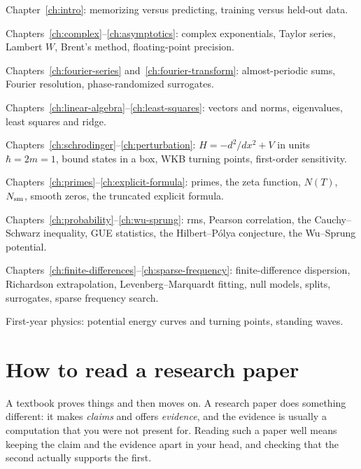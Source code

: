 \begin{prerequisites}
\item Chapter~\ref{ch:intro}: memorizing versus predicting, training versus held-out data.
\item Chapters~\ref{ch:complex}--\ref{ch:asymptotics}: complex exponentials, Taylor series, Lambert $W$, Brent's method, floating-point precision.
\item Chapters~\ref{ch:fourier-series} and~\ref{ch:fourier-transform}: almost-periodic sums, Fourier resolution, phase-randomized surrogates.
\item Chapters~\ref{ch:linear-algebra}--\ref{ch:least-squares}: vectors and norms, eigenvalues, least squares and ridge.
\item Chapters~\ref{ch:schrodinger}--\ref{ch:perturbation}: $H=-d^2/dx^2+V$ in units $\hbar=2m=1$, bound states in a box, WKB turning points, first-order sensitivity.
\item Chapters~\ref{ch:primes}--\ref{ch:explicit-formula}: primes, the zeta function, $N(T)$, $N_{\mathrm{sm}}$, smooth zeros, the truncated explicit formula.
\item Chapters~\ref{ch:probability}--\ref{ch:wu-sprung}: rms, Pearson correlation, the Cauchy--Schwarz inequality, GUE statistics, the Hilbert--P\'olya conjecture, the Wu--Sprung potential.
\item Chapters~\ref{ch:finite-differences}--\ref{ch:sparse-frequency}: finite-difference dispersion, Richardson extrapolation, Levenberg--Marquardt fitting, null models, splits, surrogates, sparse frequency search.
\item First-year physics: potential energy curves and turning points, standing waves.
\end{prerequisites}

\section{How to read a research paper}\label{sec:paper-setup-reading}

A textbook proves things and then moves on. A research paper does something different: it makes \emph{claims} and offers \emph{evidence}, and the evidence is usually a computation that you were not present for. Reading such a paper well means keeping the claim and the evidence apart in your head, and checking that the second actually supports the first.

